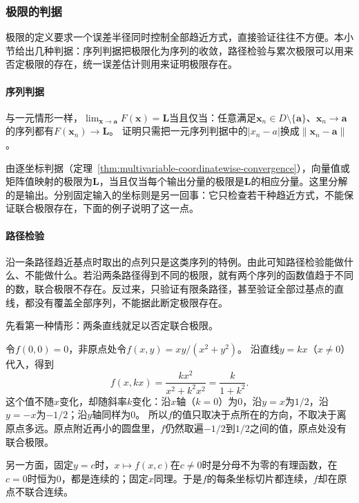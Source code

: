 \subsubsection{极限的判据}
\label{sec:multivariable-limit-criteria}

极限的定义要求一个误差半径同时控制全部趋近方式，直接验证往往不方便。本小节给出几种判据：序列判据把极限化为序列的收敛，路径检验与累次极限可以用来否定极限的存在，统一误差估计则用来证明极限存在。

\paragraph{序列判据}
与一元情形一样，$\lim_{\bm x\to\bm a}F(\bm x)=\bm L$当且仅当：任意满足$\bm x_n\in D\setminus\{\bm a\}$、$\bm x_n\to\bm a$的序列都有$F(\bm x_n)\to\bm L$。
证明只需把一元序列判据中的$|x_n-a|$换成$\lVert\bm x_n-\bm a\rVert$。

由逐坐标判据（定理~\ref{thm:multivariable-coordinatewise-convergence}），向量值或矩阵值映射的极限为$\bm L$，当且仅当每个输出分量的极限是$\bm L$的相应分量。这里分解的是输出。分别固定输入的坐标则是另一回事：它只检查若干种趋近方式，不能保证联合极限存在，下面的例子说明了这一点。

\paragraph{路径检验}
沿一条路径趋近基点时取出的点列只是这类序列的特例。由此可知路径检验能做什么、不能做什么。若沿两条路径得到不同的极限，就有两个序列的函数值趋于不同的数，联合极限不存在。反过来，只验证有限条路径，甚至验证全部过基点的直线，都没有覆盖全部序列，不能据此断定极限存在。

先看第一种情形：两条直线就足以否定联合极限。
\begin{example}[沿不同直线得到不同极限]
\label{ex:multivariable-path-limits}
令$f(0,0)=0$，非原点处令$f(x,y)=xy/(x^2+y^2)$。
沿直线$y=kx$（$x\neq0$）代入，得到
\[
 f(x,kx)=\frac{kx^2}{x^2+k^2x^2}=\frac{k}{1+k^2}.
\]
这个值不随$x$变化，却随斜率$k$变化：沿$x$轴（$k=0$）为$0$，沿$y=x$为$1/2$，沿$y=-x$为$-1/2$；沿$y$轴同样为$0$。
所以$f$的值只取决于点所在的方向，不取决于离原点多远。原点附近再小的圆盘里，$f$仍然取遍$-1/2$到$1/2$之间的值，原点处没有联合极限。

另一方面，固定$y=c$时，$x\mapsto f(x,c)$在$c\neq0$时是分母不为零的有理函数，在$c=0$时恒为$0$，都是连续的；固定$x$同理。于是$f$的每条坐标切片都连续，$f$却在原点不联合连续。
\end{example}


